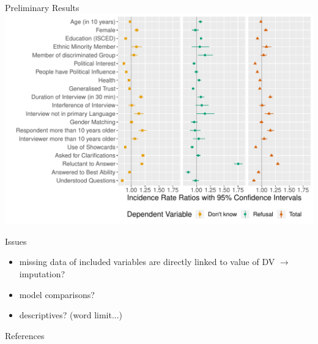 \documentclass[aspectratio=169]{beamer}
\begin{document}
\begin{frame}{Preliminary Results}
\includegraphics[scale=.35]{results.pdf}
\end{frame}


\begin{frame}{Issues}
 \begin{itemize}
  \item missing data of included variables are directly linked to value of DV $\rightarrow$ imputation?
  \item model comparisons?
  \item descriptives? (word limit...)
 \end{itemize}

\end{frame}


\begin{frame}{References}
\printbibliography
\end{frame}
\end{document}
